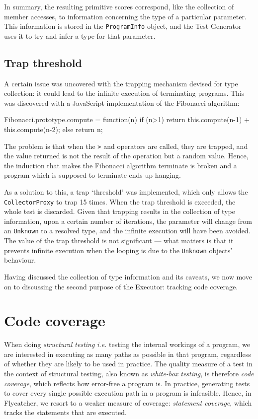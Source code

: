 In summary, the resulting primitive scores correspond, like the collection of member accesses, to information concerning the type of a particular parameter. This information is stored in the \texttt{ProgramInfo} object, and the \textsf{Test Generator} uses it to try and infer a type for that parameter.

\subsection{Trap threshold}
A certain issue was uncovered with the trapping mechanism devised for type collection: it could lead to the infinite execution of terminating programs. This was discovered with a JavaScript implementation of the Fibonacci algorithm:

\begin{code}[caption=Fibonacci in JavaScript]
Fibonacci.prototype.compute = function(n) {
    if (n>1) return this.compute(n-1) + this.compute(n-2);
    else return n;
}
\end{code}

The problem is that when the \texttt{>} and \texttt{\textendash} operators are called, they are trapped, and the value returned is not the result of the operation but a random value. Hence, the induction that makes the Fibonacci algorithm terminate is broken and a program which is supposed to terminate ends up hanging.

As a solution to this, a trap `threshold' was implemented, which only allows the \texttt{CollectorProxy} to trap 15 times. When the trap threshold is exceeded, the whole test is discarded. Given that trapping results in the collection of type information, upon a certain number of iterations, the parameter will change from an \texttt{Unknown} to a resolved type, and the infinite execution will have been avoided. The value of the trap threshold is not significant --- what matters is that it prevents infinite execution when the looping is due to the \texttt{Unknown} objects' behaviour.

Having discussed the collection of type information and its caveats, we now move on to discussing the second purpose of the \textsf{Executor}: tracking code coverage.

\section{Code coverage}

When doing \emph{structural testing} \emph{i.e.} testing the internal workings of a program, we are interested in executing as many paths as possible in that program, regardless of whether they are likely to be used in practice. The quality measure of a test in the context of structural testing, also known as \emph{white-box testing}, is therefore \emph{code coverage}, which reflects how error-free a program is. In practice, generating tests to cover every single possible execution path in a program is infeasible. Hence, in \textsf{Flycatcher}, we resort to a weaker measure of coverage: \emph{statement coverage}, which tracks the statements that are executed.

